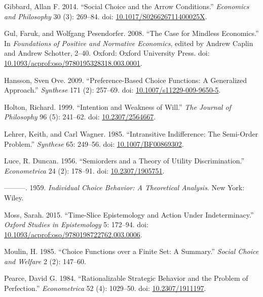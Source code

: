 \documentclass[
  11pt,
  letterpaper,
  DIV=11,
  numbers=noendperiod,
  twoside]{scrartcl}
\newlength{\cslhangindent}
\newenvironment{CSLReferences}[2] %
 {\begin{list}{}{%
  \setlength{\itemindent}{0pt}
  \setlength{\leftmargin}{0pt}
  \setlength{\parsep}{0pt}
  \ifodd #1
   \setlength{\leftmargin}{\cslhangindent}
   \setlength{\itemindent}{-1\cslhangindent}
  \fi
  \setlength{\itemsep}{#2\baselineskip}}}
 {\end{list}}
\begin{document}
\begin{CSLReferences}{1}{0}
Gibbard, Allan F. 2014. {``Social Choice and the Arrow Conditions.''}
\emph{Economics and Philosophy} 30 (3): 269--84. doi:
\href{https://doi.org/10.1017/S026626711400025X}{10.1017/S026626711400025X}.

Gul, Faruk, and Wolfgang Pesendorfer. 2008. {``The Case for Mindless
Economics.''} In \emph{Foundations of Positive and Normative Economics},
edited by Andrew Caplin and Andrew Schotter, 2--40. Oxford: Oxford
University Press. doi:
\href{https://doi.org/10.1093/acprof:oso/9780195328318.003.0001}{10.1093/acprof:oso/9780195328318.003.0001}.

Hansson, Sven Ove. 2009. {``Preference-Based Choice Functions: A
Generalized Approach.''} \emph{Synthese} 171 (2): 257--69. doi:
\href{https://doi.org/10.1007/s11229-009-9650-5}{10.1007/s11229-009-9650-5}.

Holton, Richard. 1999. {``Intention and Weakness of Will.''} \emph{The
Journal of Philosophy} 96 (5): 241--62. doi:
\href{https://doi.org/10.2307/2564667}{10.2307/2564667}.

Lehrer, Keith, and Carl Wagner. 1985. {``Intransitive Indifference: The
Semi-Order Problem.''} \emph{Synthese} 65: 249--56. doi:
\href{https://doi.org/10.1007/BF00869302}{10.1007/BF00869302}.

Luce, R. Duncan. 1956. {``Semiorders and a Theory of Utility
Discrimination.''} \emph{Econometrica} 24 (2): 178--91. doi:
\href{https://doi.org/10.2307/1905751}{10.2307/1905751}.

---------. 1959. \emph{Individual Choice Behavior: A Theoretical
Analysis}. New York: Wiley.

Moss, Sarah. 2015. {``Time-Slice Epistemology and Action Under
Indeterminacy.''} \emph{Oxford Studies in Epistemology} 5: 172--94. doi:
\href{https://doi.org/10.1093/acprof:oso/9780198722762.003.0006}{10.1093/acprof:oso/9780198722762.003.0006}.

Moulin, H. 1985. {``Choice Functions over a Finite Set: A Summary.''}
\emph{Social Choice and Welfare} 2 (2): 147--60.

Pearce, David G. 1984. {``Rationalizable Strategic Behavior and the
Problem of Perfection.''} \emph{Econometrica} 52 (4): 1029--50. doi:
\href{https://doi.org/10.2307/1911197}{10.2307/1911197}.


\end{CSLReferences}
\end{document}

